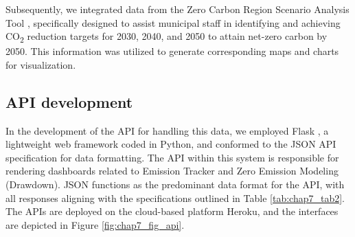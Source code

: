 Subsequently, we integrated data from the Zero Carbon Region Scenario Analysis Tool \citep{zerocarbon}, specifically designed to assist municipal staff in identifying and achieving CO\textsubscript{2} reduction targets for 2030, 2040, and 2050 to attain net-zero carbon by 2050. This information was utilized to generate corresponding maps and charts for visualization.\par

\subsection{API development}
In the development of the API for handling this data, we employed Flask \citep{grinberg2018flask}, a lightweight web framework coded in Python, and conformed to the JSON API specification for data formatting. The API within this system is responsible for rendering dashboards related to Emission Tracker and Zero Emission Modeling (Drawdown). JSON functions as the predominant data format for the API, with all responses aligning with the specifications outlined in Table \ref{tab:chap7_tab2}. The APIs are deployed on the cloud-based platform Heroku, and the interfaces are depicted in Figure \ref{fig:chap7_fig_api}. \par


